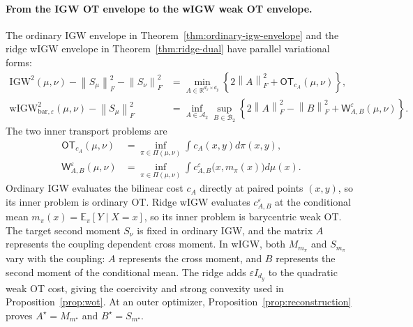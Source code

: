 \documentclass[11pt]{article}
\newcommand{\R}{\mathbb R}
\newcommand{\E}{\mathbb E}
\newcommand{\norm}[1]{\left\lVert #1\right\rVert}
\newcommand{\wIGWeps}{\mathrm{wIGW}_{\mathrm{bar},\varepsilon}}
\newcommand{\IGW}{\mathrm{IGW}}
\theoremstyle{plain}
\theoremstyle{definition}
\theoremstyle{remark}
\begin{document}
\paragraph{From the IGW OT envelope to the wIGW weak OT envelope.}
The ordinary IGW envelope in Theorem~\ref{thm:ordinary-igw-envelope} and the
ridge wIGW envelope in Theorem~\ref{thm:ridge-dual} have parallel variational
forms:
\[
\begin{aligned}
 \IGW^2(\mu,\nu)-\norm{S_\mu}_F^2-\norm{S_\nu}_F^2
 &=\min_{A\in\R^{d_x\times d_y}}
   \left\{2\norm A_F^2+\mathsf{OT}_{c_A}(\mu,\nu)\right\},\\
 \wIGWeps^2(\mu,\nu)-\norm{S_\mu}_F^2
 &=\inf_{A\in\mathcal A_2}\sup_{B\in\mathcal B_2}
   \left\{2\norm A_F^2-\norm B_F^2+
   \mathsf W_{A,B}^{\varepsilon}(\mu,\nu)\right\}.
\end{aligned}
\]
The two inner transport problems are
\[
\begin{aligned}
 \mathsf{OT}_{c_A}(\mu,\nu)
 &=\inf_{\pi\in\Pi(\mu,\nu)}\int c_A(x,y)d\pi(x,y),\\
 \mathsf W_{A,B}^{\varepsilon}(\mu,\nu)
 &=\inf_{\pi\in\Pi(\mu,\nu)}
   \int c_{A,B}^{\varepsilon}\bigl(x,m_\pi(x)\bigr)d\mu(x).
\end{aligned}
\]
Ordinary IGW evaluates the bilinear cost \(c_A\) directly at paired points
\((x,y)\), so its inner problem is ordinary OT. Ridge wIGW evaluates
\(c_{A,B}^{\varepsilon}\) at the conditional mean
\(m_\pi(x)=\E_\pi[Y\mid X=x]\), so its inner problem is barycentric weak OT.
The target second moment \(S_\nu\) is fixed in ordinary IGW, and the matrix
\(A\) represents the coupling dependent cross moment. In wIGW, both
\(M_{m_\pi}\) and \(S_{m_\pi}\) vary with the coupling: \(A\) represents the
cross moment, and \(B\) represents the second moment of the conditional mean.
The ridge adds \(\varepsilon I_{d_y}\) to the quadratic weak OT cost, giving
the coercivity and strong convexity used in Proposition~\ref{prop:wot}. At an
outer optimizer, Proposition~\ref{prop:reconstruction} proves
\(A^\star=M_{m^\star}\) and \(B^\star=S_{m^\star}\).

\end{document}
